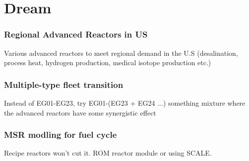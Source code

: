 \documentclass[9pt]{beamer}
\begin{document}
\section{Dream}

\begin{frame}
    \frametitle{Regional Advanced Reactors in US}
    Various advanced reactors to meet regional demand in the U.S (desalination, process heat, hydrogen production, medical isotope production etc.)
\end{frame}

\begin{frame}
    \frametitle{Multiple-type fleet transition}
    Instead of EG01-EG23, try EG01-(EG23 + EG24 ...) something mixture where the 
    advanced reactors have some synergistic effect
\end{frame}

\begin{frame}
    \frametitle{MSR modling for fuel cycle}
    Recipe reactors won't cut it. ROM reactor module or using SCALE.
\end{frame}
\end{document}
